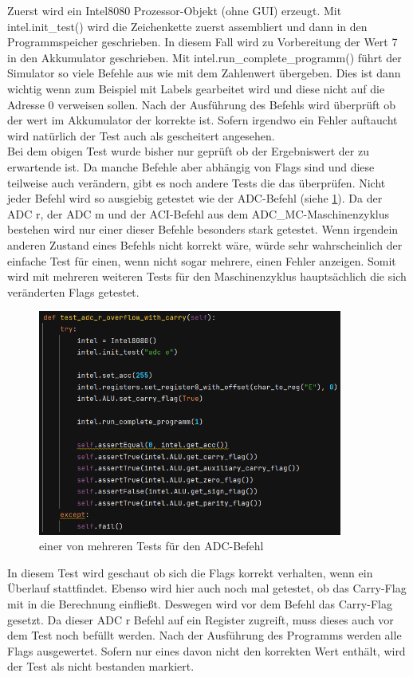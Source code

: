 \documentclass[12pt]{article}
\newcommand{\imgSpaceBefore}{\vspace{10pt}}
\begin{document}
\noindent
Zuerst wird ein Intel8080 Prozessor-Objekt (ohne GUI) erzeugt. Mit intel.init\_test() wird die Zeichenkette zuerst assembliert und dann in den Programmspeicher geschrieben. In diesem Fall wird zu Vorbereitung der Wert 7 in den Akkumulator geschrieben. Mit intel.run\_complete\_programm() führt der Simulator so viele Befehle aus wie mit dem Zahlenwert übergeben. Dies ist dann wichtig wenn zum Beispiel mit Labels gearbeitet wird und diese nicht auf die Adresse 0 verweisen sollen. Nach der Ausführung des Befehls wird überprüft ob der wert im Akkumulator der korrekte ist. Sofern irgendwo ein Fehler auftaucht wird natürlich der Test auch als gescheitert angesehen.
\\

\noindent
Bei dem obigen Test wurde bisher nur geprüft ob der Ergebniswert der zu erwartende ist. Da manche Befehle aber abhängig von Flags sind und diese teilweise auch verändern, gibt es noch andere Tests die das überprüfen. Nicht jeder Befehl wird so ausgiebig getestet wie der ADC-Befehl (siehe \ref{fig:test_adc}). Da der ADC r, der ADC m und der ACI-Befehl aus dem ADC\_MC-Maschinenzyklus bestehen wird nur einer dieser Befehle besonders stark getestet. Wenn irgendein anderen Zustand eines Befehls nicht korrekt wäre, würde sehr wahrscheinlich der einfache Test für einen, wenn nicht sogar mehrere, einen Fehler anzeigen. Somit wird mit mehreren weiteren Tests für den Maschinenzyklus hauptsächlich die sich veränderten Flags getestet.

\imgSpaceBefore
\begin{figure}[H]
\centering
\includegraphics[width=10cm]{bilder/test_adc}
\caption{einer von mehreren Tests für den ADC-Befehl}
\label{fig:test_adc}
\end{figure}

\noindent
In diesem Test wird geschaut ob sich die Flags korrekt verhalten, wenn ein Überlauf stattfindet. Ebenso wird hier auch noch mal getestet, ob das Carry-Flag mit in die Berechnung einfließt. Deswegen wird vor dem Befehl das Carry-Flag gesetzt. Da dieser ADC r Befehl auf ein Register zugreift, muss dieses auch vor dem Test noch befüllt werden. Nach der Ausführung des Programms werden alle Flags ausgewertet. Sofern nur eines davon nicht den korrekten Wert enthält, wird der Test als nicht bestanden markiert.
\end{document}

